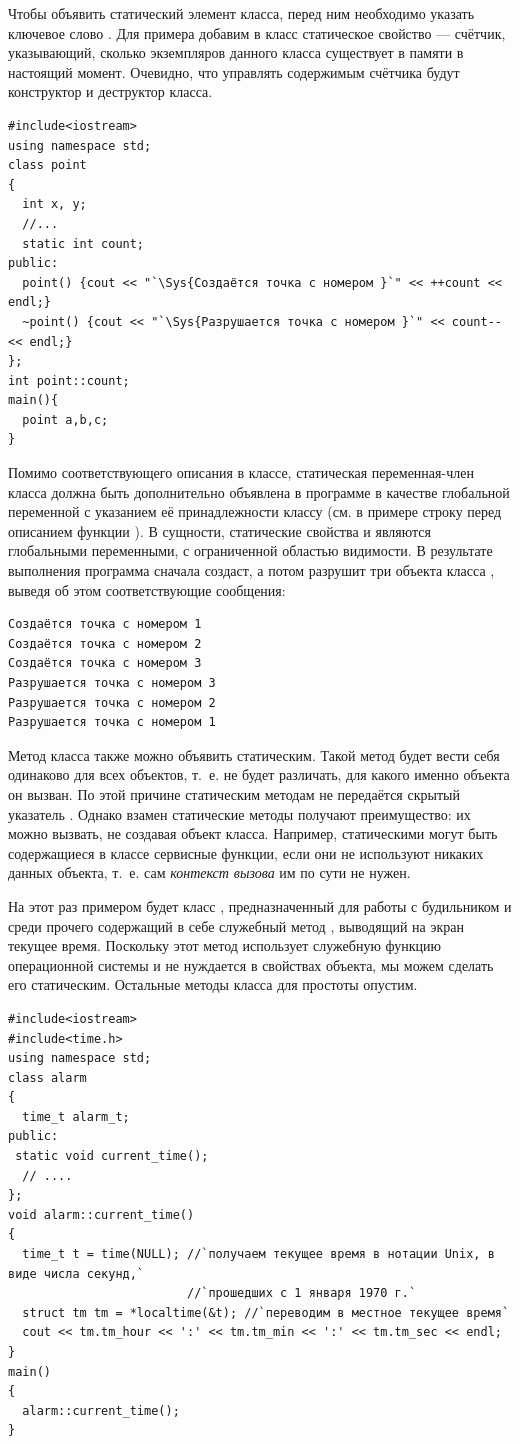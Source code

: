 Чтобы объявить статический элемент класса, перед ним необходимо указать ключевое слово . Для
примера добавим в класс  статическое свойство  --- счётчик,
указывающий, сколько экземпляров данного класса существует в памяти в настоящий момент. Очевидно, что управлять
содержимым счётчика будут конструктор и деструктор класса.
\begin{lstlisting}
#include<iostream>
using namespace std;
class point 
{
  int x, y;
  //...
  static int count;
public:
  point() {cout << "`\Sys{Создаётся точка с номером }`" << ++count << endl;}
  ~point() {cout << "`\Sys{Разрушается точка с номером }`" << count-- << endl;}
};
int point::count;
main(){
  point a,b,c;
}
\end{lstlisting}

Помимо соответствующего описания в классе, статическая переменная-член класса должна быть дополнительно объявлена в
программе в качестве глобальной переменной с указанием её принадлежности классу (см. в примере строку перед описанием
функции ). В сущности, статические свойства и являются глобальными переменными, с
ограниченной областью видимости. В результате выполнения программа сначала создаст, а потом разрушит три объекта класса
, выведя об этом соответствующие сообщения:
\begin{verbatim}
Создаётся точка с номером 1 
Создаётся точка с номером 2 
Создаётся точка с номером 3 
Разрушается точка с номером 3 
Разрушается точка с номером 2 
Разрушается точка с номером 1
\end{verbatim}

Метод класса также можно объявить статическим. Такой метод будет вести себя одинаково для всех объектов, т.~е. не будет
различать, для какого именно объекта он вызван. По этой причине статическим  методам не передаётся скрытый указатель
. Однако взамен статические методы получают преимущество: их можно вызвать, не создавая
объект класса. Например, статическими могут быть содержащиеся в классе сервисные функции, если они не используют
никаких данных объекта, т.~е. сам \emph{контекст вызова} им по сути не нужен. 

На этот раз примером будет класс , предназначенный для работы с  будильником и среди прочего
содержащий в себе служебный метод , выводящий на экран текущее время. Поскольку
этот метод использует служебную функцию операционной системы и не нуждается в свойствах объекта, мы можем сделать его
статическим. Остальные методы класса для простоты опустим.
\begin{lstlisting}
#include<iostream>
#include<time.h>
using namespace std;
class alarm 
{
  time_t alarm_t;
public:
 static void current_time();
  // ....
};
void alarm::current_time() 
{
  time_t t = time(NULL); //`получаем текущее время в нотации Unix, в виде числа секунд,`
                         //`прошедших с 1 января 1970 г.`
  struct tm tm = *localtime(&t); //`переводим в местное текущее время`
  cout << tm.tm_hour << ':' << tm.tm_min << ':' << tm.tm_sec << endl;
}
main() 
{
  alarm::current_time();
}
\end{lstlisting}

